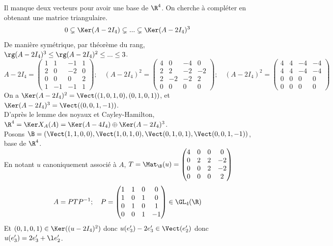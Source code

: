 \documentclass[11pt]{article}
\begin{document}
\begin{exercice}{}{}
    Il manque deux vecteurs pour avoir une base de $\R^4$. On cherche à compléter en obtenant une matrice triangulaire.
    \begin{equation*}
        0 \subsetneq \Ker(A-2I_4) \subsetneq ... \subsetneq \Ker(A-2I_4)^3
    \end{equation*}
    De manière symétrique, par théorème du rang, $\rg(A-2I_4)^3 \leq \rg(A-2I_4)^2 \leq ... \leq 3$.
    \begin{equation*}
        A-2I_4 = \begin{pmatrix}1&1&-1&1\\2&0&-2&0\\0&0&0&2\\1&-1&-1&1\end{pmatrix}; \quad (A-2I_4)^2 = \begin{pmatrix}4&0&-4&0\\2&2&-2&-2\\2&-2&-2&2\\0&0&0&0\end{pmatrix}; \quad (A-2I_4)^2 = \begin{pmatrix}4&4&-4&-4\\4&4&-4&-4\\0&0&0&0\\0&0&0&0\end{pmatrix}
    \end{equation*}
    On a $\Ker(A-2I_4)^2=\Vect((1,0,1,0),(0,1,0,1))$, et $\Ker(A-2I_4)^3=\Vect((0,0,1,-1))$.\\
    D'après le lemme des noyaux et Cayley-Hamilton, $\R^4=\Ker X_A(A) = \Ker(A-4I_4)\oplus \Ker(A-2I_4)^3$.\\
    Posons $\B=(\Vect(1,1,0,0),\Vect(1,0,1,0),\Vect(0,1,0,1),\Vect(0,0,1,-1))$, base de $\R^4$.\\
    En notant $u$ canoniquement associé à $A$, $T=\Mat_\B(u)=\begin{pmatrix}4&0&0&0 \\ 0 & 2 & 2 & -2\\ 0 & 0 & 2  & -2 \\ 0 & 0 & 0 & 2\end{pmatrix}$
    \begin{equation*}
        A=PTP^{-1}; \quad P = \begin{pmatrix}1&1&0&0\\1&0&1&0\\0&1&0&1\\0&0&1&-1\end{pmatrix}\in\GL_4(\R)
    \end{equation*}
    Et $(0,1,0,1)\in\Ker((u-2 I_4)^2)$ donc $u(e'_3) - 2e'_3 \in \Vect(e'_2)$ donc $u(e'_3)=2e'_3+\l e'_2$.
\end{exercice}
\end{document}
